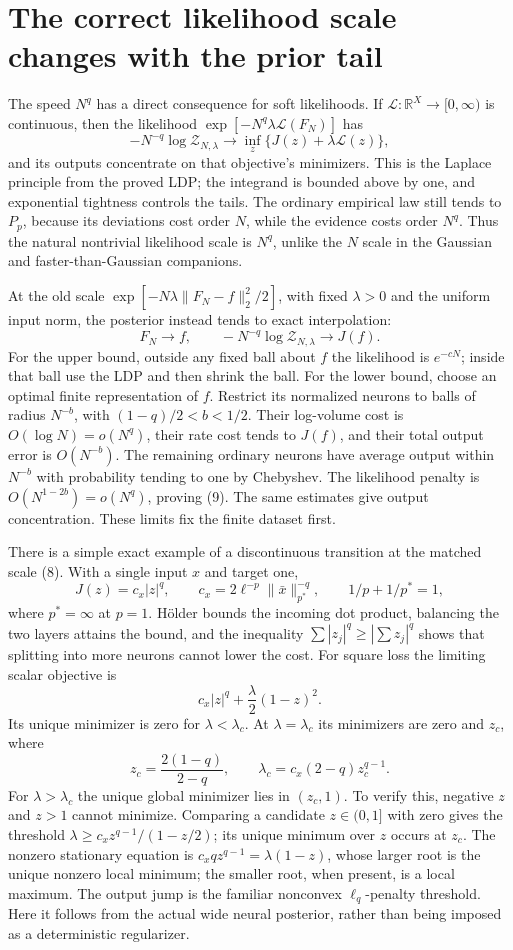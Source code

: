 \documentclass[11pt]{article}
\newcommand{\R}{\mathbb R}\newcommand{\relu}{\operatorname{ReLU}}
\begin{document}
\section{The correct likelihood scale changes with the prior tail}
The speed $N^q$ has a direct consequence for soft likelihoods. If
$\mathcal L:\R^X\to[0,\infty)$ is continuous, then the likelihood
$\exp[-N^q\lambda\mathcal L(F_N)]$ has
\[
 -N^{-q}\log\mathcal Z_{N,\lambda}
       \longrightarrow\inf_z\{J(z)+\lambda\mathcal L(z)\}, \tag{8}
\]
and its outputs concentrate on that objective's minimizers. This is the
Laplace principle from the proved LDP; the integrand is bounded above
by one, and exponential tightness controls the tails. The ordinary
empirical law still tends to $P_p$, because its deviations cost order
$N$, while the evidence costs order $N^q$. Thus the natural nontrivial
likelihood scale is $N^q$, unlike the $N$ scale in the Gaussian and
faster-than-Gaussian companions.

At the old scale $\exp[-N\lambda\|F_N-f\|_2^2/2]$, with fixed
$\lambda>0$ and the uniform input norm, the posterior instead tends to
exact interpolation:
\[
 F_N\to f,\qquad -N^{-q}\log\mathcal Z_{N,\lambda}\to J(f). \tag{9}
\]
For the upper bound, outside any fixed ball about $f$ the likelihood
is $e^{-cN}$; inside that ball use the LDP and then shrink the ball.
For the lower bound, choose an optimal finite representation of $f$.
Restrict its normalized neurons to balls of radius $N^{-b}$, with
$(1-q)/2<b<1/2$. Their log-volume cost is $O(\log N)=o(N^q)$,
their rate cost tends to $J(f)$, and their total output error is
$O(N^{-b})$. The remaining ordinary neurons have average output within
$N^{-b}$ with probability tending to one by Chebyshev. The likelihood
penalty is $O(N^{1-2b})=o(N^q)$, proving (9). The same estimates give
output concentration. These limits fix the finite dataset first.

There is a simple exact example of a discontinuous transition at the
matched scale (8). With a single input $x$ and target one,
\[
 J(z)=c_x|z|^q,\qquad
 c_x=2\ell^{-p}\|\bar x\|_{p^*}^{-q},\qquad
 1/p+1/p^*=1,
\]
where $p^*=\infty$ at $p=1$. H\"older bounds the incoming dot product,
balancing the two layers attains the bound, and the inequality
$\sum|z_j|^q\ge|\sum z_j|^q$ shows that splitting into more neurons
cannot lower the cost. For square loss the limiting scalar objective is
\[
 c_x|z|^q+\frac\lambda2(1-z)^2.
\]
Its unique minimizer is zero for $\lambda<\lambda_c$. At
$\lambda=\lambda_c$ its minimizers are zero and $z_c$, where
\[
 z_c=\frac{2(1-q)}{2-q},\qquad
 \lambda_c=c_x(2-q)z_c^{q-1}.
\]
For $\lambda>\lambda_c$ the unique global minimizer lies in $(z_c,1)$.
To verify this, negative $z$ and $z>1$ cannot minimize. Comparing a
candidate $z\in(0,1]$ with zero gives the threshold
$\lambda\ge c_x z^{q-1}/(1-z/2)$; its unique minimum over $z$ occurs
at $z_c$. The nonzero stationary equation is
$c_xqz^{q-1}=\lambda(1-z)$, whose larger root is the unique nonzero
local minimum; the smaller root, when present, is a local maximum.
The output jump is the familiar nonconvex $\ell_q$-penalty threshold.
Here it follows from the actual wide neural posterior, rather than
being imposed as a deterministic regularizer.
\end{document}
